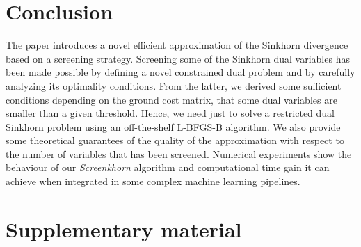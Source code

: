 \documentclass{article}
\begin{document}
\section{Conclusion}
The paper introduces a novel efficient approximation of the Sinkhorn divergence
based on a screening strategy. Screening some of the Sinkhorn dual variables
has been made possible by defining a novel constrained dual problem and by 
carefully analyzing its optimality conditions. From the latter, we derived some
sufficient conditions depending on the ground cost matrix, that some dual variables are smaller than a given threshold. Hence, we need just to solve a restricted
dual Sinkhorn problem using an off-the-shelf L-BFGS-B algorithm. We also provide
some theoretical guarantees of the quality of the approximation with respect to
the number of variables that has been screened. Numerical experiments show 
the behaviour of our \emph{Screenkhorn} algorithm and computational time gain it can
achieve when integrated in some complex machine learning pipelines.



\small



\newpage
\section{Supplementary material}

\end{document}
